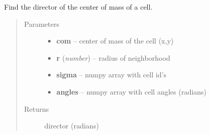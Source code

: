 \documentclass[letterpaper,10pt,english]{sphinxmanual}
\begin{document}
\begin{fulllineitems}
\label{AnalysisUtils:AnalysisUtils.getDirector}
Find the director of the center of mass of a cell.
\begin{quote}\begin{description}
\item[{Parameters}] \leavevmode\begin{itemize}
\item {} 
\textbf{com} -- center of mass of the cell (x,y)

\item {} 
\textbf{r} (\emph{number}) -- radius of neighborhood

\item {} 
\textbf{sigma} -- numpy array with cell id's

\item {} 
\textbf{angles} -- numpy array with cell angles (radians)

\end{itemize}

\item[{Returns}] \leavevmode
director (radians)

\end{description}\end{quote}

\end{fulllineitems}

\end{document}
